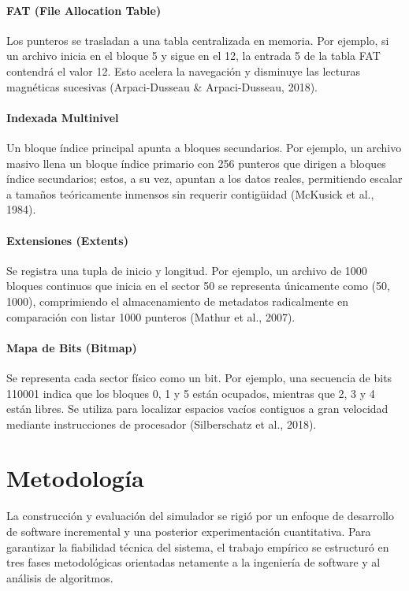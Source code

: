 \documentclass[12pt,a4paper]{article}
\begin{document}
\paragraph{FAT (File Allocation Table)}
Los punteros se trasladan a una tabla centralizada en memoria. Por ejemplo, si un archivo inicia en el bloque 5 y sigue en el 12, la entrada 5 de la tabla FAT contendrá el valor 12. Esto acelera la navegación y disminuye las lecturas magnéticas sucesivas (Arpaci-Dusseau \& Arpaci-Dusseau, 2018).

\paragraph{Indexada Multinivel}
Un bloque índice principal apunta a bloques secundarios. Por ejemplo, un archivo masivo llena un bloque índice primario con 256 punteros que dirigen a bloques índice secundarios; estos, a su vez, apuntan a los datos reales, permitiendo escalar a tamaños teóricamente inmensos sin requerir contigüidad (McKusick et al., 1984).

\paragraph{Extensiones (Extents)}
Se registra una tupla de inicio y longitud. Por ejemplo, un archivo de 1000 bloques continuos que inicia en el sector 50 se representa únicamente como (50, 1000), comprimiendo el almacenamiento de metadatos radicalmente en comparación con listar 1000 punteros (Mathur et al., 2007).

\paragraph{Mapa de Bits (Bitmap)}
Se representa cada sector físico como un bit. Por ejemplo, una secuencia de bits 110001 indica que los bloques 0, 1 y 5 están ocupados, mientras que 2, 3 y 4 están libres. Se utiliza para localizar espacios vacíos contiguos a gran velocidad mediante instrucciones de procesador (Silberschatz et al., 2018).

\section{Metodología}

La construcción y evaluación del simulador se rigió por un enfoque de desarrollo de software incremental y una posterior experimentación cuantitativa. Para garantizar la fiabilidad técnica del sistema, el trabajo empírico se estructuró en tres fases metodológicas orientadas netamente a la ingeniería de software y al análisis de algoritmos.
\end{document}
